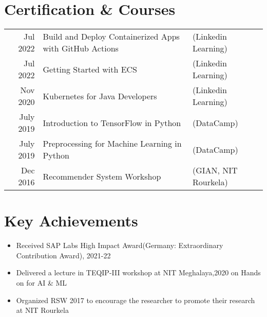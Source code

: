 \documentclass[a4paper,12pt]{article}
\begin{document}
\section{Certification \& Courses}
\begin{tabular}{rll}
	Jul 2022  & Build and Deploy Containerized Apps with GitHub Actions & (Linkedin Learning)    \\
	Jul 2022  & Getting Started with ECS                                & (Linkedin Learning)    \\
	Nov 2020  & Kubernetes for Java Developers                          & (Linkedin Learning)    \\
	July 2019 & Introduction to TensorFlow in Python                    & (DataCamp)             \\
	July 2019 & Preprocessing for Machine Learning in Python            & (DataCamp)             \\
	Dec 2016  & Recommender System Workshop                             & (GIAN, NIT Rourkela) 
\end{tabular}

\section{Key Achievements}
\begin{itemize}[nosep,after=\strut, leftmargin=1em, itemsep=3pt]
	\item Received SAP Labs High Impact Award(Germany: Extraordinary Contribution Award), 2021-22
	\item Delivered a lecture in TEQIP-III workshop at NIT Meghalaya,2020 on Hands on for AI \& ML
	\item Organized RSW 2017 to encourage the researcher to promote their research at NIT Rourkela
\end{itemize}

\vfill
\end{document}
